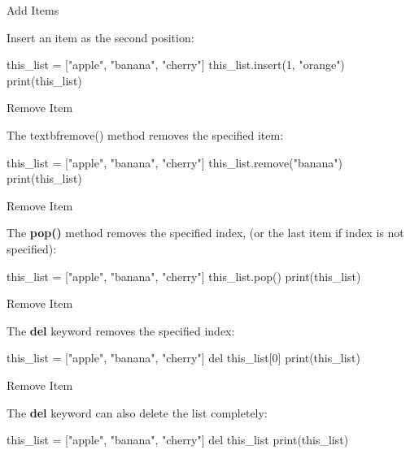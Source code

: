 \documentclass[hyperref={pdfpagelabels=false}]{beamer}
\begin{document}
\begin{frame}[fragile]{Add Items}
\begin{exampleblock}{Insert an item as the second position:}
\begin{python3}
this_list = ["apple", "banana", "cherry"]
this_list.insert(1, "orange")
print(this_list)
\end{python3}
\end{exampleblock}
\end{frame}

\begin{frame}[fragile]{Remove Item}
\begin{exampleblock}{The textbf{remove()} method removes the specified item:}
\begin{python3}
this_list = ["apple", "banana", "cherry"]
this_list.remove("banana")
print(this_list)
\end{python3}
\end{exampleblock}
\end{frame}

\begin{frame}[fragile]{Remove Item}
\begin{exampleblock}{The \textbf{pop()} method removes the specified index, (or the last item if index is not specified):}
\begin{python3}
this_list = ["apple", "banana", "cherry"]
this_list.pop()
print(this_list)
\end{python3}
\end{exampleblock}
\end{frame}

\begin{frame}[fragile]{Remove Item}
\begin{exampleblock}{The \textbf{del} keyword removes the specified index:}
\begin{python3}
this_list = ["apple", "banana", "cherry"]
del this_list[0]
print(this_list)
\end{python3}
\end{exampleblock}
\end{frame}

\begin{frame}[fragile]{Remove Item}
\begin{alertblock}{The \textbf{del} keyword can also delete the list completely:}
\begin{python3}
this_list = ["apple", "banana", "cherry"]
del this_list
print(this_list)
\end{python3}
\end{alertblock}
\end{frame}
\end{document}
